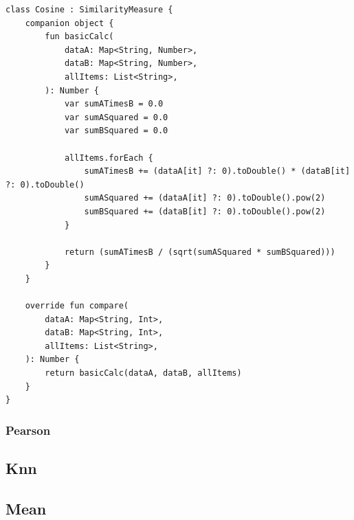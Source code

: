 \begin{verbatim}
class Cosine : SimilarityMeasure {
    companion object {
        fun basicCalc(
            dataA: Map<String, Number>,
            dataB: Map<String, Number>,
            allItems: List<String>,
        ): Number {
            var sumATimesB = 0.0
            var sumASquared = 0.0
            var sumBSquared = 0.0

            allItems.forEach {
                sumATimesB += (dataA[it] ?: 0).toDouble() * (dataB[it] ?: 0).toDouble()
                sumASquared += (dataA[it] ?: 0).toDouble().pow(2)
                sumBSquared += (dataB[it] ?: 0).toDouble().pow(2)
            }

            return (sumATimesB / (sqrt(sumASquared * sumBSquared)))
        }
    }

    override fun compare(
        dataA: Map<String, Int>,
        dataB: Map<String, Int>,
        allItems: List<String>,
    ): Number {
        return basicCalc(dataA, dataB, allItems)
    }
}
\end{verbatim}

\subsubsection{Pearson}

\subsection{Knn}

\subsection{Mean}